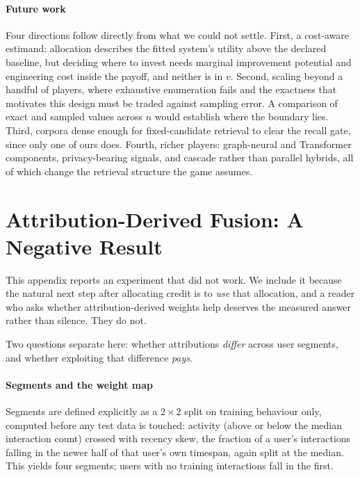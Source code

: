 \documentclass[pdflatex,sn-basic,Numbered]{sn-jnl}
\theoremstyle{plain}
\theoremstyle{definition}
\begin{document}
\paragraph{Future work}
Four directions follow directly from what we could not settle. First, a
cost-aware estimand: allocation describes the fitted system's utility above
the declared baseline, but deciding
where to invest needs marginal improvement potential and engineering cost
inside the payoff, and neither is in $v$. Second, scaling beyond a handful of
players, where exhaustive enumeration fails and the exactness that motivates
this design must be traded against sampling error. A comparison of exact and sampled values across $n$ would establish where the boundary lies. Third,
corpora dense enough for fixed-candidate retrieval to clear the recall gate,
since only one of ours does. Fourth, richer players: graph-neural and
Transformer components, privacy-bearing signals, and cascade rather than
parallel hybrids, all of which change the retrieval structure the game
assumes.

\appendix

\section{Attribution-Derived Fusion: A Negative Result}\label{app:fusion}

This appendix reports an experiment that did not work. We include it because
the natural next step after allocating credit is to \emph{use} that allocation,
and a reader who asks whether attribution-derived weights help deserves the
measured answer rather than silence. They do not.

Two questions separate here: whether attributions \emph{differ} across user
segments, and whether exploiting that difference \emph{pays}.

\paragraph{Segments and the weight map}
Segments are defined explicitly as a $2\times2$ split on training
behaviour only, computed before any test data is touched: activity (above or
below the median interaction count) crossed with recency skew, the fraction of
a user's interactions falling in the newer half of that user's own timespan,
again split at the median. This yields four segments; users with no training
interactions fall in the first.
\end{document}
